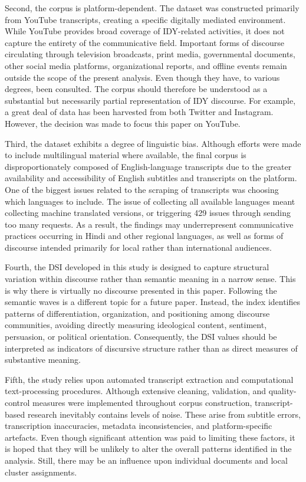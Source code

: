 \documentclass[11pt]{article}
\begin{document}
Second, the corpus is platform-dependent. The dataset was constructed primarily from YouTube transcripts, creating a specific digitally mediated environment. While YouTube provides broad coverage of IDY-related activities, it does not capture the entirety of the communicative field. Important forms of discourse circulating through television broadcasts, print media, governmental documents, other social media platforms, organizational reports, and offline events remain outside the scope of the present analysis. Even though they have, to various degrees, been consulted. The corpus should therefore be understood as a substantial but necessarily partial representation of IDY discourse. For example, a great deal of data has been harvested from both Twitter and Instagram. However, the decision was made to focus this paper on YouTube.

Third, the dataset exhibits a degree of linguistic bias. Although efforts were made to include multilingual material where available, the final corpus is disproportionately composed of English-language transcripts due to the greater availability and accessibility of English subtitles and transcripts on the platform. One of the biggest issues related to the scraping of transcripts was choosing which languages to include. The issue of collecting all available languages meant collecting machine translated versions, or triggering 429 issues through sending too many requests. As a result, the findings may underrepresent communicative practices occurring in Hindi and other regional languages, as well as forms of discourse intended primarily for local rather than international audiences.

Fourth, the DSI developed in this study is designed to capture structural variation within discourse rather than semantic meaning in a narrow sense. This is why there is virtually no discourse presented in this paper. Following the semantic waves is a different topic for a future paper. Instead, the index identifies patterns of differentiation, organization, and positioning among discourse communities, avoiding directly measuring ideological content, sentiment, persuasion, or political orientation. Consequently, the DSI values should be interpreted as indicators of discursive structure rather than as direct measures of substantive meaning.

Fifth, the study relies upon automated transcript extraction and computational text-processing procedures. Although extensive cleaning, validation, and quality-control measures were implemented throughout corpus construction, transcript-based research inevitably contains levels of noise. These arise from subtitle errors, transcription inaccuracies, metadata inconsistencies, and platform-specific artefacts. Even though significant attention was paid to limiting these factors, it is hoped that they will be unlikely to alter the overall patterns identified in the analysis. Still, there  may be an influence upon individual documents and local cluster assignments.
\end{document}
